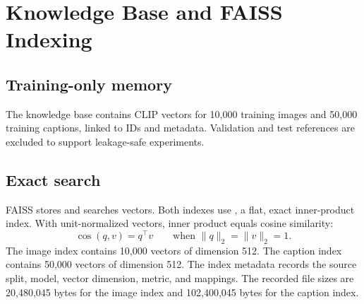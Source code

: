 \section{Knowledge Base and FAISS Indexing}
\label{ch:knowledge-base}

\subsection{Training-only memory}
The knowledge base contains CLIP vectors for 10,000 training images and 50,000 training captions, linked to IDs and metadata. Validation and test references are excluded to support leakage-safe experiments.

\subsection{Exact search}
FAISS stores and searches vectors. Both indexes use , a flat, exact inner-product index. With unit-normalized vectors, inner product equals cosine similarity:
\[
  \operatorname{cos}(q,v)=q^\top v
  \qquad \text{when } \lVert q\rVert_2=\lVert v\rVert_2=1.
\]
The image index contains 10,000 vectors of dimension 512. The caption index contains 50,000 vectors of dimension 512. The index metadata records the source split, model, vector dimension, metric, and mappings. The recorded file sizes are 20,480,045 bytes for the image index and 102,400,045 bytes for the caption index.




